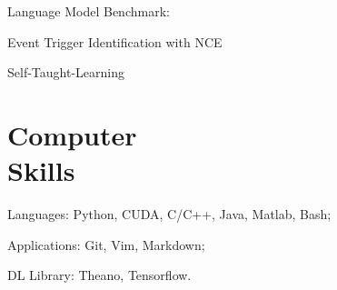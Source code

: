 \documentclass[margin,line]{resume}
\begin{document}
\begin{resume}
Language Model Benchmark:

Event Trigger Identification with NCE

Self-Taught-Learning


\section{Computer \\ Skills}
Languages:  Python, CUDA, C/C++, Java, Matlab, Bash;

Applications: Git, Vim, Markdown;

DL Library: Theano, Tensorflow.\\




\end{resume}
\end{document}
